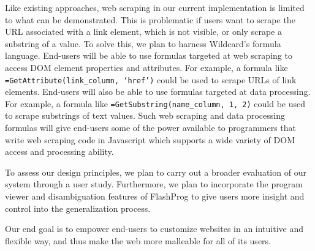 \documentclass[sigconf,10pt]{acmart}
\begin{document}
Like existing approaches, web scraping in our current implementation is
limited to what can be demonstrated. This is problematic if users want
to scrape the URL associated with a link element, which is not visible,
or only scrape a substring of a value. To solve this, we plan to harness
Wildcard's formula language. End-users will be able to use formulas
targeted at web scraping to access DOM element properties and
attributes. For example, a formula like
\texttt{=GetAttribute(link\_column,\ ‘href’)} could be used to scrape
URLs of link elements. End-users will also be able to use formulas
targeted at data processing. For example, a formula like
\texttt{=GetSubstring(name\_column,\ 1,\ 2)} could be used to scrape
substrings of text values. Such web scraping and data processing
formulas will give end-users some of the power available to programmers
that write web scraping code in Javascript which supports a wide variety
of DOM access and processing ability.

To assess our design principles, we plan to carry out a broader
evaluation of our system through a user study. Furthermore, we plan to
incorporate the program viewer and disambiguation features of FlashProg
\citep{mayer2015} to give users more insight and control into the
generalization process.

Our end goal is to empower end-users to customize websites in an
intuitive and flexible way, and thus make the web more malleable for all
of its users.




\end{document}
